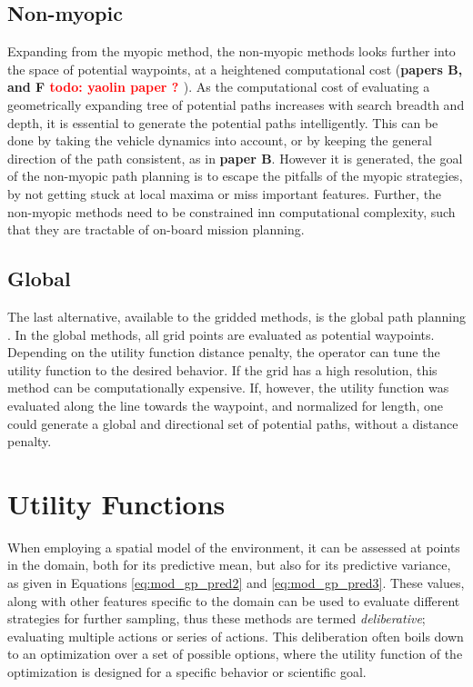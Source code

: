 \subsection{Non-myopic}
Expanding from the myopic method, the non-myopic methods\cite{stankiewicz2021adaptive,fossum2021learning} looks further into the space of potential waypoints, at a heightened computational cost (\textbf{papers B, and F \textcolor{red}{todo: yaolin paper ? }}). As the computational cost of evaluating a geometrically expanding tree of potential paths increases with search breadth and depth, it is essential to generate the potential paths intelligently. This can be done by taking the vehicle dynamics into account\cite{stankiewicz2021adaptive}, or by keeping the general direction of the path consistent, as in \textbf{paper B}. However it is generated, the goal of the non-myopic path planning is to escape the pitfalls of the myopic strategies, by not getting stuck at local maxima or miss important features. Further, the non-myopic methods need to be constrained inn computational complexity, such that they are tractable of on-board mission planning.  

\subsection{Global}
The last alternative, available to the gridded methods, is the global path planning \cite{kemna2016adaptive}. In the global methods, all grid points are evaluated as potential waypoints. Depending on the utility function distance penalty, the operator can tune the utility function to the desired behavior. If the grid has a high resolution, this method can be computationally expensive. If, however, the utility function was evaluated along the line towards the waypoint, and normalized for length, one could generate a global and directional set of potential paths, without a distance penalty. 

\section{Utility Functions}
When employing a spatial model of the environment, it can be assessed at points in the domain, both for its predictive mean, but also for its predictive variance, as given in Equations \eqref{eq:mod_gp_pred2} and \eqref{eq:mod_gp_pred3}. These values, along with other features specific to the domain can be used to evaluate different strategies for further sampling, thus these methods are termed \textit{deliberative}; evaluating multiple actions or series of actions. This deliberation often boils down to an optimization over a set of possible options, where the utility function of the optimization is designed for a specific behavior or scientific goal. 



